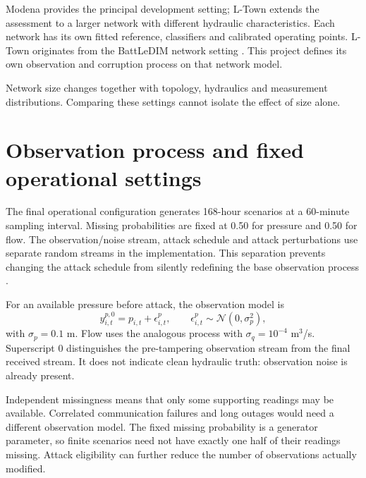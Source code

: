 
Modena provides the principal development setting; L-Town extends the assessment to a larger network with different hydraulic characteristics. Each network has its own fitted reference, classifiers and calibrated operating points. L-Town originates from the BattLeDIM network setting \cite{battledim}. This project defines its own observation and corruption process on that network model.

Network size changes together with topology, hydraulics and measurement distributions. Comparing these settings cannot isolate the effect of size alone.

\section{Observation process and fixed operational settings}
The final operational configuration generates 168-hour scenarios at a 60-minute sampling interval. Missing probabilities are fixed at 0.50 for pressure and 0.50 for flow. The observation/noise stream, attack schedule and attack perturbations use separate random streams in the implementation. This separation prevents changing the attack schedule from silently redefining the base observation process \cite{projectgenerator}.

For an available pressure before attack, the observation model is
\begin{equation}
 y^{p,0}_{i,t}=p_{i,t}+\epsilon^p_{i,t},
 \qquad \epsilon^p_{i,t}\sim\mathcal N(0,\sigma_p^2),
\end{equation}
with $\sigma_p=0.1$ m. Flow uses the analogous process with $\sigma_q=10^{-4}$ m$^3$/s. Superscript $0$ distinguishes the pre-tampering observation stream from the final received stream. It does not indicate clean hydraulic truth: observation noise is already present.

Independent missingness means that only some supporting readings may be available. Correlated communication failures and long outages would need a different observation model. The fixed missing probability is a generator parameter, so finite scenarios need not have exactly one half of their readings missing. Attack eligibility can further reduce the number of observations actually modified.

